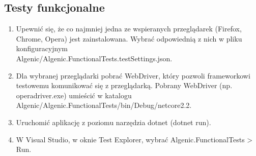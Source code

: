 \documentclass{article}
\begin{document}
\subsection{Testy funkcjonalne}
\begin{enumerate}
    \item Upewnić się, że co najmniej jedna ze wspieranych przeglądarek (Firefox, Chrome, Opera) jest zainstalowana. Wybrać odpowiednią z nich w pliku konfiguracyjnym\\Algenic/Algenic.FunctionalTests.testSettings.json.
    \item Dla wybranej przeglądarki pobrać WebDriver, który pozwoli frameworkowi testowemu komunikować się z przeglądarką. Pobrany WebDriver (np. operadriver.exe) umieścić w katalogu Algenic/Algenic.FunctionalTests/bin/Debug/netcore2.2.
    \item Uruchomić aplikację z poziomu narzędzia dotnet (dotnet run).
    \item W Visual Studio, w oknie Test Explorer, wybrać Algenic.FunctionalTests > Run.
\end{enumerate}
\end{document}
